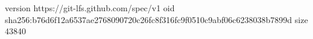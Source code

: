 version https://git-lfs.github.com/spec/v1
oid sha256:b76d6f12a6537ae2768090720c26fc8f316fc9f0510c9abf06c6238038b7899d
size 43840
